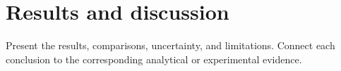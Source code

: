 \section{Results and discussion}\label{sec:results}
Present the results, comparisons, uncertainty, and limitations. Connect
each conclusion to the corresponding analytical or experimental evidence.
